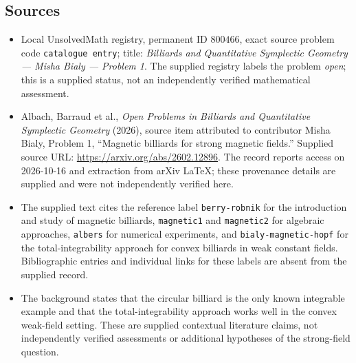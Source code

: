 \documentclass[11pt]{article}
\begin{document}
\subsection{Sources}
\begin{itemize}
\item Local UnsolvedMath registry, permanent ID \(800466\), exact source problem code \texttt{catalogue entry}; title: \emph{Billiards and Quantitative Symplectic Geometry --- Misha Bialy --- Problem 1}. The supplied registry labels the problem \emph{open}; this is a supplied status, not an independently verified mathematical assessment.
\item Albach, Barraud et al., \emph{Open Problems in Billiards and Quantitative Symplectic Geometry} (2026), source item attributed to contributor Misha Bialy, Problem 1, ``Magnetic billiards for strong magnetic fields.'' Supplied source URL: \url{https://arxiv.org/abs/2602.12896}. The record reports access on 2026-10-16 and extraction from arXiv LaTeX; these provenance details are supplied and were not independently verified here.
\item The supplied text cites the reference label \texttt{berry-robnik} for the introduction and study of magnetic billiards, \texttt{magnetic1} and \texttt{magnetic2} for algebraic approaches, \texttt{albers} for numerical experiments, and \texttt{bialy-magnetic-hopf} for the total-integrability approach for convex billiards in weak constant fields. Bibliographic entries and individual links for these labels are absent from the supplied record.
\item The background states that the circular billiard is the only known integrable example and that the total-integrability approach works well in the convex weak-field setting. These are supplied contextual literature claims, not independently verified assessments or additional hypotheses of the strong-field question.
\end{itemize}
\end{document}
